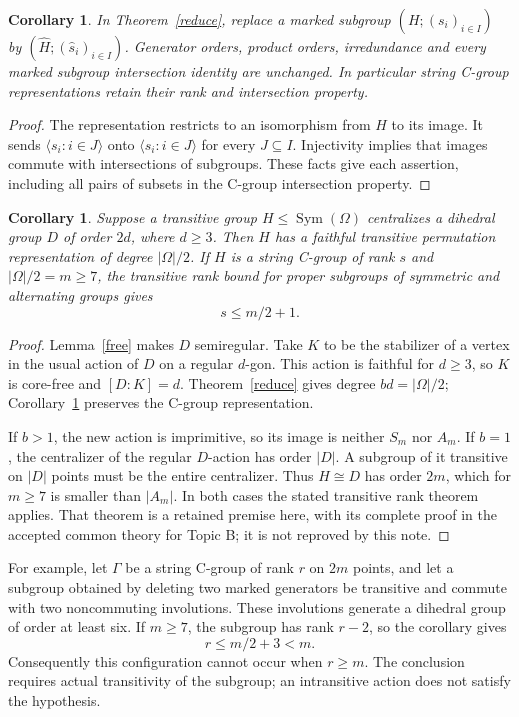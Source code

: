\documentclass[11pt,a4paper]{article}
\newtheorem{corollary}[theorem]{Corollary}
\newcommand{\Sym}{\operatorname{Sym}}
\begin{document}
\begin{corollary}\label{marked}
In Theorem~\ref{reduce}, replace a marked subgroup
$(H;(s_i)_{i\in I})$ by $(\widehat H;(\widehat s_i)_{i\in I})$.
Generator orders, product orders, irredundance and every marked subgroup
intersection identity are unchanged. In particular string C-group
representations retain their rank and intersection property.
\end{corollary}
\begin{proof}
The representation restricts to an isomorphism from $H$ to its image.
It sends $\langle s_i:i\in J\rangle$ onto
$\langle\widehat s_i:i\in J\rangle$ for every $J\subseteq I$.
Injectivity implies that images commute with intersections of subgroups.
These facts give each assertion, including all pairs of subsets in the
C-group intersection property.
\end{proof}

\begin{corollary}\label{dihedral}
Suppose a transitive group $H\leq\Sym(\Omega)$ centralizes a dihedral
group $D$ of order $2d$, where $d\geq3$. Then $H$ has a faithful transitive
permutation representation of degree $|\Omega|/2$. If $H$ is a string
C-group of rank $s$ and $|\Omega|/2=m\geq7$, the transitive rank bound
for proper subgroups of symmetric and alternating groups gives
\[
                         s\leq m/2+1.
\]
\end{corollary}
\begin{proof}
Lemma~\ref{free} makes $D$ semiregular. Take $K$ to be the stabilizer of
a vertex in the usual action of $D$ on a regular $d$-gon. This action
is faithful for $d\geq3$, so $K$ is core-free and $[D:K]=d$.
Theorem~\ref{reduce} gives degree $bd=|\Omega|/2$; Corollary~\ref{marked}
preserves the C-group representation.

If $b>1$, the new action is imprimitive, so its image is neither $S_m$
nor $A_m$. If $b=1$, the centralizer of the regular $D$-action has
order $|D|$. A subgroup of it transitive on $|D|$ points must be the
entire centralizer. Thus $H\cong D$ has order $2m$, which for $m\geq7$
is smaller than $|A_m|$. In both cases the stated transitive rank theorem
applies. That theorem is a retained premise here, with its complete proof
in the accepted common theory for Topic B; it is not reproved by this note.
\end{proof}

For example, let $\Gamma$ be a string C-group of rank $r$ on $2m$ points,
and let a subgroup obtained by deleting two marked generators be
transitive and commute with two noncommuting involutions. These involutions
generate a dihedral group of order at least six. If $m\geq7$, the subgroup
has rank $r-2$, so the corollary gives
\[
                     r\leq m/2+3<m.
\]
Consequently this configuration cannot occur when $r\geq m$.
The conclusion requires actual transitivity of the subgroup; an
intransitive action does not satisfy the hypothesis.
\end{document}

